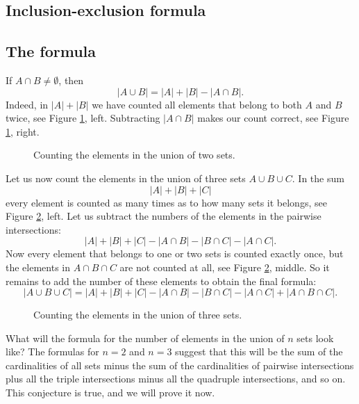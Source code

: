 \begin{page}

\section{Inclusion-exclusion formula}
\subsection{The formula}
If $A \cap B \ne \emptyset$, then
\[
|A \cup B| = |A| + |B| - |A \cap B|.
\]
Indeed, in $|A|+|B|$ we have counted all elements that belong to both $A$ and $B$ twice, see Figure \ref{fig:IncExc2}, left.
Subtracting $|A \cap B|$ makes our count correct, see Figure \ref{fig:IncExc2}, right.

\begin{figure}[ht]
\begin{center}

\end{center}
\caption{Counting the elements in the union of two sets.}
\label{fig:IncExc2}
\end{figure}

Let us now count the elements in the union of three sets $A \cup B \cup C$.
In the sum
\[
|A| + |B| + |C|
\]
every element is counted as many times as to how many sets it belongs, see Figure \ref{fig:IncExc3}, left.
Let us subtract the numbers of the elements in the pairwise intersections:
\[
|A| + |B| + |C| - |A \cap B| - |B \cap C| - |A \cap C|.
\]
Now every element that belongs to one or two sets is counted exactly once,
but the elements in $A \cap B \cap C$ are not counted at all, see Figure \ref{fig:IncExc3}, middle.
So it remains to add the number of these elements to obtain the final formula:
\[
|A \cup B \cup C| = |A| + |B| + |C| - |A \cap B| - |B \cap C| - |A \cap C| + |A \cap B \cap C|.
\]

\begin{figure}[ht]
\begin{center}

\end{center}
\caption{Counting the elements in the union of three sets.}
\label{fig:IncExc3}
\end{figure}

What will the formula for the number of elements in the union of $n$ sets look like?
The formulas for $n=2$ and $n=3$ suggest that this will be the sum of the cardinalities of all sets
minus the sum of the cardinalities of pairwise intersections plus all the triple intersections
minus all the quadruple intersections, and so on.
This conjecture is true, and we will prove it now.


\end{page}

